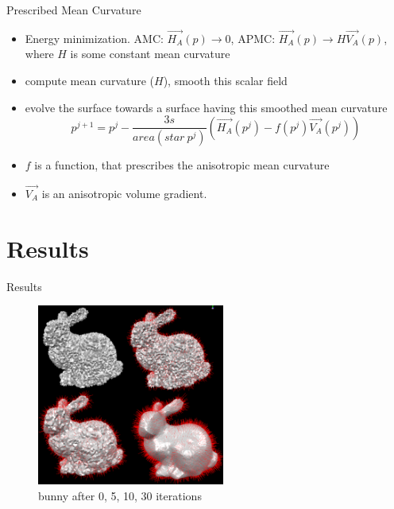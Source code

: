 \documentclass{beamer}
\begin{document}
\begin{frame}{Prescribed Mean Curvature}
\begin{itemize}
\item Energy minimization. AMC: $\vec{H_A}(p) \rightarrow 0$, APMC: $\vec{H_A}(p) \rightarrow H\vec{V_A}(p)$, where $H$ is some constant mean curvature
\item compute mean curvature ($H$), smooth this scalar field
\item evolve the surface towards a surface having this smoothed mean curvature
\begin{equation*}
p^{j+1} = p^{j} - \dfrac{3s}{area(star\ p^j)}(\vec{H_A}(p^j) - f(p^j)\vec{V_A}(p^j))
\end{equation*}
\item $f$ is a function, that prescribes the anisotropic mean curvature
\item $\vec{V_A}$ is an anisotropic volume gradient.
\end{itemize}
\end{frame}


\section{Results}

\begin{frame}{Results}
\begin{figure}[htb]
\centering
\includegraphics[width=0.55\textwidth]{bunnies_1_10_30_raw.PNG}
\caption{bunny after 0, 5, 10, 30 iterations}
\label{fig:bunny0_1_10_30}
\end{figure}
\end{frame}
\end{document}
